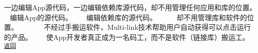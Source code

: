 一边编辑\+App源代码，一边编辑依赖库源代码，却不用管理任何应用和库的位置。 ~\newline
 编辑\+App的源代码。 ~\newline
 ~\newline
编辑依赖库的源代码。 ~\newline
 ~\newline
 ~\newline
却不用管理库和软件的位置。 ~\newline
 ~\newline
 ~\newline
 ~\newline
不经过手搬运软件，\+Multi-\/link技术帮助用户自动获得可以点击运行的产品。 ~\newline
 ~\newline
使\+App开发者真正成为一名码工，而不是软件（链接库）搬运工。 ~\newline
 \href{.}{\tt 返回} 